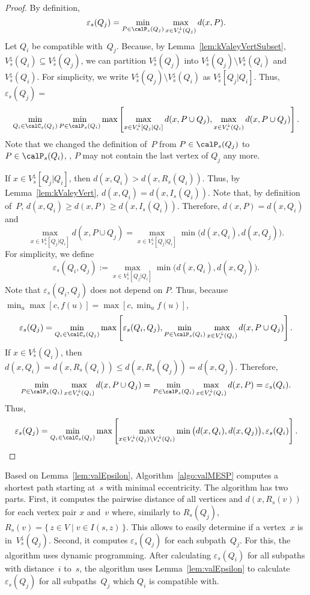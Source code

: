 \begin{proof}
By definition,
\[
    \varepsilon_s(Q_j)
    =
    \min_{P \in \calP_s(Q_j)} \max_{x \in V^\downarrow_s(Q_j)} d(x, P).
\]
Let $Q_{i}$ be compatible with~$Q_j$.
Because, by Lemma~\ref{lem:kValeyVertSubset}, $V^\downarrow_s(Q_{i}) \subseteq V^\downarrow_s(Q_j)$, we can partition $V^\downarrow_s(Q_j)$ into $V^\downarrow_s(Q_j) \setminus V^\downarrow_s(Q_{i})$ and $V^\downarrow_s(Q_{i})$.
For simplicity, we write $V^\downarrow_s(Q_j) \setminus V^\downarrow_s(Q_{i})$ as $V^\downarrow_s[Q_j|Q_i]$.
Thus, $\varepsilon_s(Q_j) =$
\[
    \min_{Q_{i} \in \calC_s(Q_j)} \min_{P \in \calP_s(Q_{i})} \max \left[
        \max_{x \in V^\downarrow_s[Q_j|Q_i]} d(x, P \cup Q_j),
        \max_{x \in V^\downarrow_s(Q_{i})} d(x, P \cup Q_j)
    \right].
\]
Note that we changed the definition of~$P$ from $P \in \calP_s(Q_j)$ to $P \in \calP_s(Q_{i})$, \ie, $P$ may not contain the last vertex of $Q_j$ any more.

If $x \in V^\downarrow_s[Q_j|Q_i]$, then $d(x, Q_{i}) > d(x, R_s(Q_{i}))$.
Thus, by Lemma~\ref{lem:kValeyVert}, $d(x, Q_{i}) = d(x, I_s(Q_{i}))$.
Note that, by definition of~$P$, $d(x, Q_i) \geq d(x, P) \geq d(x, I_s(Q_i))$.
Therefore, $d(x, P) = d(x, Q_i)$ and
\[
    \max_{x \in V^\downarrow_s[Q_j|Q_i]} d(x, P \cup Q_j)
    =
    \max_{x \in V^\downarrow_s[Q_j|Q_i]} \min \big( d(x, Q_{i}), d(x, Q_{j}) \big).
\]
For simplicity, we define
\[
    \varepsilon_s(Q_i, Q_j)
    :=
    \max_{x \in V^\downarrow_s[Q_j|Q_i]} \min \big( d(x, Q_{i}), d(x, Q_{j}) \big).
\]
Note that $\varepsilon_s(Q_i, Q_j)$ does not depend on $P$.
Thus, because $\min_{u} \max [ c, f(u) ] = \max [ c, \min_{u} f(u) ]$,
\[
    \varepsilon_s(Q_j)
    =
    \min_{Q_{i} \in \calC_s(Q_j)} \max \left[
        \varepsilon_s(Q_i, Q_j),
        \min_{P \in \calP_s(Q_{i})} \max_{x \in V^\downarrow_s(Q_{i})} d(x, P \cup Q_j)
    \right].
\]
If $x \in V^\downarrow_s(Q_{i})$, then $d(x, Q_{i}) = d(x, R_s(Q_{i})) \leq d(x, R_s(Q_j)) = d(x, Q_j)$.
Therefore,
\[
    \min_{P \in \calP_s(Q_{i})} \max_{x \in V^\downarrow_s(Q_{i})} d(x, P \cup Q_j)
    =
    \min_{P \in \calP_s(Q_{i})} \max_{x \in V^\downarrow_s(Q_{i})} d(x, P)
    =
    \varepsilon_s(Q_{i}).
\]
Thus,
\[
    \varepsilon_s(Q_j)
    =
    \min_{Q_{i} \in \calC_s(Q_j)} \max \left[
        \max_{x \in V^\downarrow_s(Q_j) \setminus V^\downarrow_s(Q_{i})} \min \big( d(x, Q_{i}), d(x, Q_{j}) \big),
        \varepsilon_s(Q_{i})
    \right].
    \qedhere
\]
\end{proof}

Based on Lemma~\ref{lem:valEpsilon}, Algorithm~\ref{algo:valMESP} computes a shortest path starting at~$s$ with minimal eccentricity.
The algorithm has two parts.
First, it computes the pairwise distance of all vertices and $d(x, R_s(v))$ for each vertex pair $x$ and~$v$ where, similarly to $R_s(Q_j)$, $R_s(v) = \{ \, z \in V \mid v \in I(s, z) \, \}$.
This allows to easily determine if a vertex~$x$ is in~$V^\downarrow_s(Q_j)$.
Second, it computes $\varepsilon_s(Q_j)$ for each subpath~$Q_j$.
For this, the algorithm uses dynamic programming.
After calculating $\varepsilon_s(Q_i)$ for all subpaths with distance~$i$ to~$s$, the algorithm uses Lemma~\ref{lem:valEpsilon} to calculate $\varepsilon_s(Q_j)$ for all subpaths~$Q_j$ which $Q_i$ is compatible with.

